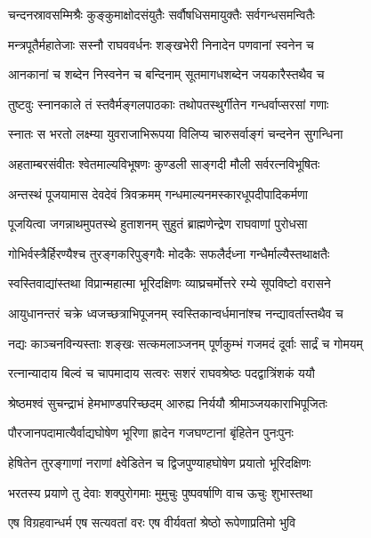 \twolineshloka
{चन्दनस्रावसम्मिश्रैः कुङ्कुमाक्षोदसंयुतैः}
{सर्वौषधिसमायुक्तैः सर्वगन्धसमन्वितैः}%

\twolineshloka
{मन्त्रपूतैर्महातेजाः सस्नौ राघववर्धनः}
{शङ्खभेरी निनादेन पणवानां स्वनेन च}%

\twolineshloka
{आनकानां च शब्देन निस्वनेन च बन्दिनाम्}
{सूतमागधशब्देन जयकारैस्तथैव च}%

\twolineshloka
{तुष्टवुः स्नानकाले तं स्तवैर्मङ्गलपाठकाः}
{तथोपतस्थुर्गीतेन गन्धर्वाप्सरसां गणाः}%

\twolineshloka
{स्नातः स भरतो लक्ष्म्या युवराजाभिरूपया}
{विलिप्य चारुसर्वाङ्गं चन्दनेन सुगन्धिना}%

\twolineshloka
{अहताम्बरसंवीतः श्वेतमाल्यविभूषणः}
{कुण्डली साङ्गदी मौली सर्वरत्नविभूषितः}%

\twolineshloka
{अन्तस्थं पूजयामास देवदेवं त्रिवक्रमम्}
{गन्धमाल्यनमस्कारधूपदीपादिकर्मणा} %

\twolineshloka
{पूजयित्वा जगन्नाथमुपतस्थे हुताशनम्}
{सुहुतं ब्राह्मणेन्द्रेण राघवाणां पुरोधसा}%

\twolineshloka
{गोभिर्वस्त्रैर्हिरण्यैश्च तुरङ्गकरिपुङ्गवैः}
{मोदकैः सफलैर्दध्ना गन्धैर्माल्यैस्तथाक्षतैः}%

\twolineshloka
{स्वस्तिवाद्यांस्तथा विप्रान्महात्मा भूरिदक्षिणः}
{व्याघ्रचर्मोत्तरे रम्ये सूपविष्टो वरासने}%

\twolineshloka
{आयुधानन्तरं चक्रे ध्वजच्छत्राभिपूजनम्}
{स्वस्तिकान्वर्धमानांश्च नन्द्यावर्तास्तथैव च}%

\twolineshloka
{नद्यः काञ्चनविन्यस्ताः शङ्खः सत्कमलाञ्जनम्}
{पूर्णकुम्भं गजमदं दूर्वाः सार्द्रं च गोमयम्}%

\twolineshloka
{रत्नान्यादाय बिल्वं च चापमादाय सत्वरः}
{सशरं राघवश्रेष्ठः पदद्वात्रिंशकं ययौ}%

\twolineshloka
{श्रेष्ठमश्वं सुचन्द्राभं हेमभाण्डपरिच्छदम्}
{आरुह्य निर्ययौ श्रीमाञ्जयकाराभिपूजितः}%

\twolineshloka
{पौरजानपदामात्यैर्वाद्यघोषेण भूरिणा}
{ह्रादेन गजघण्टानां बृंहितेन पुनःपुनः}%

\twolineshloka
{हेषितेन तुरङ्गाणां नराणां क्ष्वेडितेन च}
{द्विजपुण्याहघोषेण प्रयातो भूरिदक्षिणः}%

\twolineshloka
{भरतस्य प्रयाणे तु देवाः शक्पुरोगमाः}
{मुमुचुः पुष्पवर्षाणि वाच ऊचुः शुभास्तथा} %

\twolineshloka
{एष विग्रहवान्धर्म एष सत्यवतां वरः}
{एष वीर्यवतां श्रेष्ठो रूपेणाप्रतिमो भुवि}%

